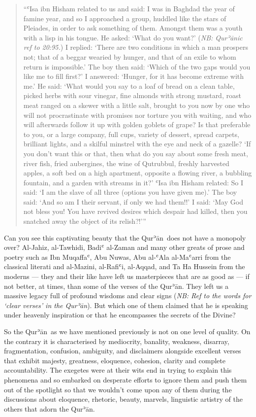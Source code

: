 \documentclass[12pt]{memoir}
\def\´{ʾ} %
\def\`{ʿ} %
\def \Quran{Qur\-\´ān} %
\def\–{-\hskip0pt}
\newcommand{\QRef}[1]{{\color{darkblue}#1}}
\newcommand{\NB}[1]{\emph{\small NB: #1}}
\begin{document}
\begin{quote}
“\`Isa ibn Hisham related to us and said: I was in Baghdad the year of
famine year, and so I approached a group,
huddled like the stars of Pleiades, in order to ask something of them.
Amongst them was a youth with a lisp in his tongue.
He asked: ‘What do you want?’
(\NB{\Quran{}ic ref to \QRef{20:95}.})
I replied: ‘There are two conditions in which a man prospers not;
that of a beggar wearied by hunger,
and that of an exile to whom return is impossible.’
The boy then said: ‘Which of the two gaps would you like me to fill first?’
I answered: ‘Hunger, for it has become extreme with me.’
He said: ‘What would you say to a loaf of bread on a clean table,
picked herbs with sour vinegar, fine almonds with strong mustard,
roast meat ranged on a skewer with a little salt,
brought to you now by one who will not procrastinate with promises
nor torture you with waiting, and who will afterwards follow it up
with golden goblets of grape? Is that preferable to you, or a large company,
full cups, variety of dessert, spread carpets, brilliant lights,
and a skilful minstrel with the eye and neck of a gazelle?
‘If you don’t want this or that, then what do you say about some fresh meat,
river fish, fried aubergines, the wine of Qutrubbul,
freshly harvested apples, a soft bed on a high apartment,
opposite a flowing river, a bubbling fountain,
and a garden with streams in it?’
\`Isa ibn Hisham related: So I said: ‘I am the slave of all three
(options you have given me).’
The boy said: ‘And so am I their servant, if only we had them!!’
I said: ‘May God not bless you! You have revived desires which
despair had killed, then you snatched away the object of its relish?!’”
\end{quote}

Can you see this captivating beauty that
the \Quran\ does not have a monopoly over?
Al\–Jahiz, al\–Tawhidi, Badi\` al\–Zaman
and many other greats of prose and poetry
such as Ibn Muqaffa\`, Abu Nuwas, Abu al\–\`Ala al\–Ma\`arri
from the classical literati and al\–Mazini, al\–Rafi\`i, al\–Aqqad,
and Ta Ha Hussein from the moderns —
they and their like have left us masterpieces that are as good as —
if not better, at times, than some of the verses of the \Quran.
They left us a massive legacy full of profound wisdoms and clear signs
(\NB{Ref to the words for ‘clear verses’ in the \Quran}).
But which one of them claimed that he is speaking under heavenly inspiration
or that he encompasses the secrets of the Divine?

So the \Quran\ as we have mentioned previously is not on one level of quality.
On the contrary it is characterised by mediocrity, banality, weakness,
disarray, fragmentation, confusion, ambiguity,
and disclaimers alongside excellent verses that exhibit
majesty, greatness, eloquence, cohesion, clarity and complete accountability.
The exegetes were at their wits end in trying to explain this phenomena
and so embarked on desperate efforts to ignore them and push them out of
the spotlight so that we wouldn’t come upon any of them during
the discussions about eloquence, rhetoric, beauty, marvels, linguistic
artistry of the others that adorn the \Quran.
\end{document}
